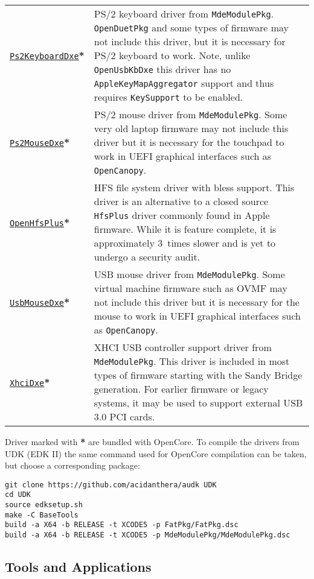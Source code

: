 \documentclass[]{article}
\begin{document}
\begin{longtable}{p{1.3in}p{5.55in}}
\href{https://github.com/acidanthera/audk}{\texttt{Ps2KeyboardDxe}}\textbf{*}
& PS/2 keyboard driver from \texttt{MdeModulePkg}. \texttt{OpenDuetPkg} and some types of firmware
  may not include this driver, but it is necessary for PS/2 keyboard to work.
  Note, unlike \texttt{OpenUsbKbDxe} this driver has no \texttt{AppleKeyMapAggregator}
  support and thus requires \texttt{KeySupport} to be enabled. \\
\href{https://github.com/acidanthera/audk}{\texttt{Ps2MouseDxe}}\textbf{*}
& PS/2 mouse driver from \texttt{MdeModulePkg}. Some very old laptop firmware
  may not include this driver but it is necessary for the touchpad to work
  in UEFI graphical interfaces such as \texttt{OpenCanopy}. \\
\href{https://github.com/acidanthera/OpenCorePkg}{\texttt{OpenHfsPlus}}\textbf{*}
& HFS file system driver with bless support. This driver is an alternative to
  a closed source \texttt{HfsPlus} driver commonly found in Apple firmware. While
  it is feature complete, it is approximately 3~times slower and is yet to undergo
  a security audit. \\
\href{https://github.com/acidanthera/audk}{\texttt{UsbMouseDxe}}\textbf{*}
& USB mouse driver from \texttt{MdeModulePkg}. Some virtual machine firmware
  such as OVMF may not include this driver but it is necessary for the mouse to work
  in UEFI graphical interfaces such as \texttt{OpenCanopy}. \\
\href{https://github.com/acidanthera/audk}{\texttt{XhciDxe}}\textbf{*}
& XHCI USB controller support driver from \texttt{MdeModulePkg}. This driver is
  included in most types of firmware starting with the Sandy Bridge generation. For earlier firmware
  or legacy systems, it may be used to support external USB 3.0 PCI cards.
\end{longtable}

Driver marked with \textbf{*} are bundled with OpenCore.
To compile the drivers from UDK (EDK II) the same command used for
OpenCore compilation can be taken, but choose a corresponding package:
\begin{lstlisting}[label=compileudk, style=ocbash]
git clone https://github.com/acidanthera/audk UDK
cd UDK
source edksetup.sh
make -C BaseTools
build -a X64 -b RELEASE -t XCODE5 -p FatPkg/FatPkg.dsc
build -a X64 -b RELEASE -t XCODE5 -p MdeModulePkg/MdeModulePkg.dsc
\end{lstlisting}

\subsection{Tools and Applications}\label{uefitools}
\end{document}
